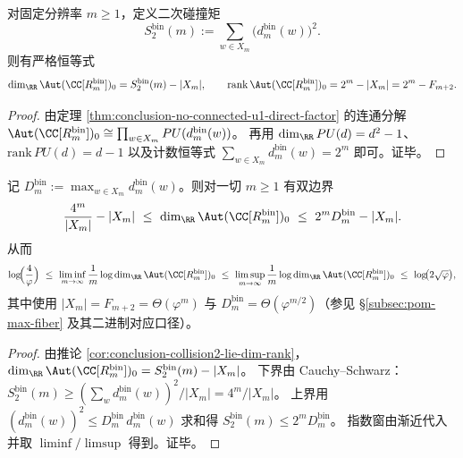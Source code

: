 \begin{corollary}\label{cor:conclusion-collision2-lie-dim-rank}
对固定分辨率 \(m\ge 1\)，定义二次碰撞矩
\[
S_2^{\mathrm{bin}}(m):=\sum_{w\in X_m}\bigl(d_m^{\mathrm{bin}}(w)\bigr)^2.
\]
则有严格恒等式
\[
\dim_{\RR}\Aut(\CC[R_m^{\mathrm{bin}}])_0
=S_2^{\mathrm{bin}}(m)-|X_m|,
\qquad
\mathrm{rank}\,\Aut(\CC[R_m^{\mathrm{bin}}])_0
=2^m-|X_m|
=2^m-F_{m+2}.
\]
\end{corollary}
\begin{proof}
由定理 \ref{thm:conclusion-no-connected-u1-direct-factor} 的连通分解
\(
\Aut(\CC[R_m^{\mathrm{bin}}])_0\cong\prod_{w\in X_m}PU(d_m^{\mathrm{bin}}(w))
\)。
再用 \(\dim_{\RR}PU(d)=d^2-1\)、\(\mathrm{rank}\,PU(d)=d-1\) 以及计数恒等式
\(
\sum_{w\in X_m}d_m^{\mathrm{bin}}(w)=2^m
\)
即可。证毕。
\end{proof}

\begin{corollary}[连续规范对称维度的黄金夹逼与指数窗]\label{cor:conclusion-golden-squeeze-dim-aut}
记 \(D_m^{\mathrm{bin}}:=\max_{w\in X_m}d_m^{\mathrm{bin}}(w)\)。则对一切 \(m\ge 1\) 有双边界
\[
\frac{4^m}{|X_m|}-|X_m|
\ \le\
\dim_{\RR}\Aut(\CC[R_m^{\mathrm{bin}}])_0
\ \le\
2^mD_m^{\mathrm{bin}}-|X_m|.
\]
从而
\[
\log\!\Bigl(\frac4\varphi\Bigr)
\ \le\
\liminf_{m\to\infty}\frac1m\log \dim_{\RR}\Aut(\CC[R_m^{\mathrm{bin}}])_0
\ \le\
\limsup_{m\to\infty}\frac1m\log \dim_{\RR}\Aut(\CC[R_m^{\mathrm{bin}}])_0
\ \le\
\log\!\bigl(2\sqrt\varphi\bigr),
\]
其中使用 \(|X_m|=F_{m+2}=\Theta(\varphi^m)\) 与 \(D_m^{\mathrm{bin}}=\Theta(\varphi^{m/2})\)（参见 \S\ref{subsec:pom-max-fiber} 及其二进制对应口径）。
\end{corollary}
\begin{proof}
由推论 \ref{cor:conclusion-collision2-lie-dim-rank}，
\(
\dim_{\RR}\Aut(\CC[R_m^{\mathrm{bin}}])_0=S_2^{\mathrm{bin}}(m)-|X_m|
\)。
下界由 Cauchy--Schwarz：
\(
S_2^{\mathrm{bin}}(m)\ge (\sum_w d_m^{\mathrm{bin}}(w))^2/|X_m|=4^m/|X_m|
\)。
上界用 \((d_m^{\mathrm{bin}}(w))^2\le D_m^{\mathrm{bin}}\,d_m^{\mathrm{bin}}(w)\) 求和得
\(
S_2^{\mathrm{bin}}(m)\le 2^mD_m^{\mathrm{bin}}
\)。
指数窗由渐近代入并取 \(\liminf/\limsup\) 得到。证毕。
\end{proof}


